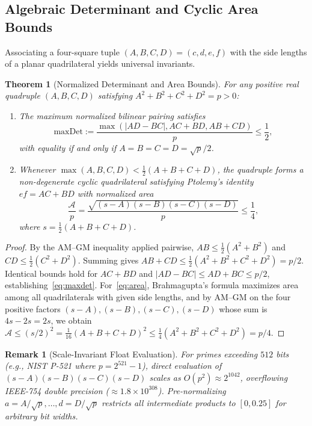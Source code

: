 \documentclass[conference]{IEEEtran}
\newtheorem{theorem}{Theorem}
\newtheorem{remark}{Remark}
\begin{document}
\subsection{Algebraic Determinant and Cyclic Area Bounds}
Associating a four-square tuple $(A, B, C, D) = (c, d, e, f)$ with the side lengths of a planar quadrilateral yields universal invariants.

\begin{theorem}[Normalized Determinant and Area Bounds]
\label{thm:bounds}
For any positive real quadruple $(A, B, C, D)$ satisfying $A^2 + B^2 + C^2 + D^2 = p > 0$:
\begin{enumerate}
    \item The maximum normalized bilinear pairing satisfies
    \begin{equation}
    \mathrm{maxDet} := \frac{\max(|AD - BC|, AC + BD, AB + CD)}{p} \le \frac{1}{2},
    \label{eq:maxdet}
    \end{equation}
    with equality if and only if $A = B = C = D = \sqrt{p}/2$.
    \item Whenever $\max(A, B, C, D) < \frac{1}{2}(A + B + C + D)$, the quadruple forms a non-degenerate cyclic quadrilateral satisfying Ptolemy's identity $ef = AC + BD$ with normalized area
    \begin{equation}
    \frac{\mathcal{A}}{p} = \frac{\sqrt{(s-A)(s-B)(s-C)(s-D)}}{p} \le \frac{1}{4},
    \label{eq:area}
    \end{equation}
    where $s = \frac{1}{2}(A+B+C+D)$.
\end{enumerate}
\end{theorem}

\begin{proof}
By the AM--GM inequality applied pairwise, $AB \le \frac{1}{2}(A^2 + B^2)$ and $CD \le \frac{1}{2}(C^2 + D^2)$. Summing gives $AB + CD \le \frac{1}{2}(A^2 + B^2 + C^2 + D^2) = p/2$. Identical bounds hold for $AC + BD$ and $|AD - BC| \le AD + BC \le p/2$, establishing~\eqref{eq:maxdet}. For~\eqref{eq:area}, Brahmagupta's formula maximizes area among all quadrilaterals with given side lengths, and by AM--GM on the four positive factors $(s-A), (s-B), (s-C), (s-D)$ whose sum is $4s - 2s = 2s$, we obtain $\mathcal{A} \le (s/2)^2 = \frac{1}{16}(A+B+C+D)^2 \le \frac{1}{4}(A^2+B^2+C^2+D^2) = p/4$.
\end{proof}

\begin{remark}[Scale-Invariant Float Evaluation]
For primes exceeding $512$ bits (e.g., NIST P-521 where $p = 2^{521}-1$), direct evaluation of $(s-A)(s-B)(s-C)(s-D)$ scales as $O(p^2) \approx 2^{1042}$, overflowing IEEE-754 double precision ($\approx 1.8 \times 10^{308}$). Pre-normalizing $a = A/\sqrt{p}, \dots, d = D/\sqrt{p}$ restricts all intermediate products to $[0, 0.25]$ for arbitrary bit widths.
\end{remark}
\end{document}
